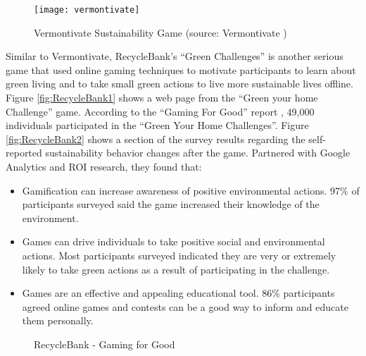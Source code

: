 \begin{figure}[ht!]
	\centering
		\texttt{[image: vermontivate]}
		\caption{Vermontivate Sustainability Game (source: Vermontivate \cite{vermontivate})}
		\label{fig:vermontivate}
\end{figure}

Similar to Vermontivate, RecycleBank's ``Green Challenges'' \cite {recyclebank} is another serious game that used online gaming techniques to motivate participants to learn about green living and to take small green actions to live more sustainable lives offline. Figure \autoref{fig:RecycleBank1} shows a web page from the ``Green your home Challenge'' game. According to the ``Gaming For Good'' report \cite {gamingforgood}, 49,000 individuals participated in the ``Green Your Home Challenges''. Figure \autoref{fig:RecycleBank2} shows a section of the survey results regarding the self-reported sustainability behavior changes after the game. Partnered with Google Analytics and ROI research, they found that:
\begin{itemize}
	\item Gamification can increase awareness of positive environmental actions. 97\% of participants surveyed said the game increased their knowledge of the environment.
	\item Games can drive individuals to take positive social and environmental actions. Most participants surveyed indicated they are very or extremely likely to take green actions as a result of participating in the challenge.
	\item Games are an effective and appealing educational tool. 86\% participants agreed online games and contests can be a good way to inform and educate them personally.
\end{itemize}

\begin{figure}[ht!]
	\centering
		\caption{RecycleBank - Gaming for Good}
		\label{fig:recyclebank}
\end{figure}

